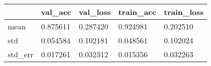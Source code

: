 \begin{tabular}{|l|l|l|l|l|}
\toprule \hline
 & val\_acc & val\_loss & train\_acc & train\_loss \\ \hline
\midrule
mean & 0.875611 & 0.287420 & 0.924981 & 0.202510 \\ \hline
std & 0.054584 & 0.102181 & 0.048561 & 0.102024 \\ \hline
std\_err & 0.017261 & 0.032312 & 0.015356 & 0.032263 \\ \hline
\bottomrule
\end{tabular}
